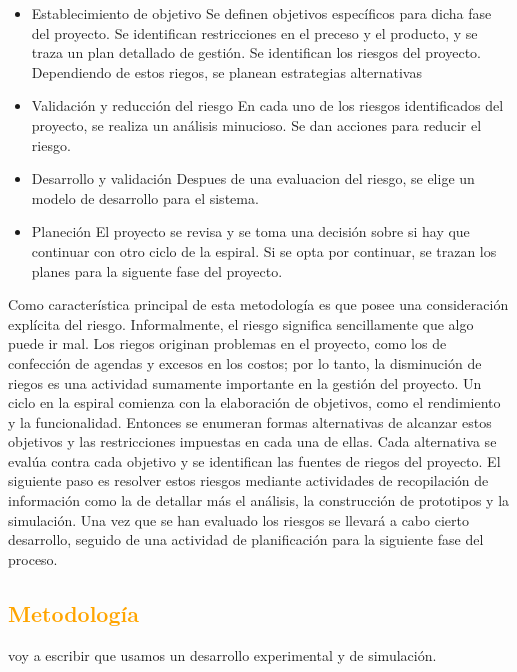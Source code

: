 \documentclass[a4paper,11pt]{article}
\begin{document}
\begin {itemize}
\item Establecimiento de objetivo  Se definen objetivos específicos para dicha fase del proyecto. Se identifican restricciones en el preceso y el producto, y se traza un plan detallado de gestión. Se identifican los riesgos del proyecto. Dependiendo de estos riegos, se planean estrategias alternativas
\item Validación y reducción del riesgo  En cada uno de los riesgos identificados del proyecto, se realiza un análisis minucioso. Se dan acciones para reducir el riesgo.
\item Desarrollo y validación  Despues de una evaluacion del riesgo, se elige un modelo de desarrollo para el sistema.
\item Planeción  El proyecto se revisa y se toma una decisión sobre si hay que continuar con otro ciclo de la espiral. Si se opta por continuar, se trazan los planes para la siguente fase del proyecto.
 \end {itemize}

Como característica principal de esta metodología es que posee una consideración explícita del riesgo. Informalmente, el riesgo significa sencillamente que algo puede ir mal. Los riegos originan problemas en el proyecto, como los de confección de agendas y excesos en los costos; por lo tanto, la disminución de riegos es una actividad sumamente importante en la gestión del proyecto.
Un ciclo en la espiral comienza con la elaboración de objetivos, como el rendimiento y la funcionalidad. Entonces se enumeran formas alternativas de alcanzar estos objetivos y las restricciones impuestas en cada una de ellas. Cada alternativa se evalúa contra cada objetivo y se identifican las fuentes de riegos del proyecto. El siguiente paso es resolver estos riesgos mediante actividades de recopilación de información como la de detallar más el análisis, la construcción de prototipos y la simulación. Una vez que se han evaluado los riesgos se llevará a cabo cierto desarrollo, seguido de una actividad de planificación para la siguiente fase del proceso.

\subsection{\textcolor{orange}{Metodología}}

voy a escribir que usamos un desarrollo experimental y de simulación.
\end{document}
